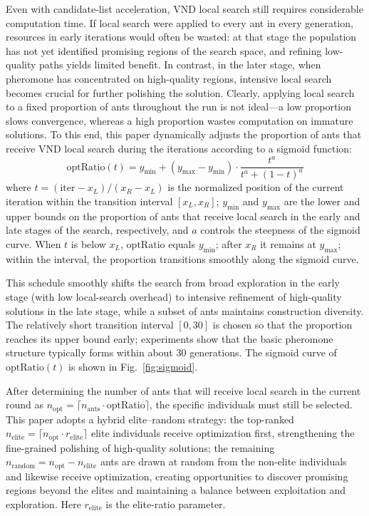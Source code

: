 Even with candidate-list acceleration, VND local search still requires considerable computation time. If local search were applied to every ant in every generation, resources in early iterations would often be wasted: at that stage the population has not yet identified promising regions of the search space, and refining low-quality paths yields limited benefit. In contrast, in the later stage, when pheromone has concentrated on high-quality regions, intensive local search becomes crucial for further polishing the solution. Clearly, applying local search to a fixed proportion of ants throughout the run is not ideal---a low proportion slows convergence, whereas a high proportion wastes computation on immature solutions. To this end, this paper dynamically adjusts the proportion of ants that receive VND local search during the iterations according to a sigmoid function:
\begin{equation}
\mathrm{optRatio}(t) = y_{\min} + (y_{\max} - y_{\min}) \cdot \frac{t^{a}}{t^{a} + (1 - t)^{a}}
\label{eq:sigmoid}
\end{equation}
where $t = (\mathrm{iter} - x_L) / (x_R - x_L)$ is the normalized position of the current iteration within the transition interval $[x_L, x_R]$; $y_{\min}$ and $y_{\max}$ are the lower and upper bounds on the proportion of ants that receive local search in the early and late stages of the search, respectively, and $a$ controls the steepness of the sigmoid curve. When $t$ is below $x_L$, $\mathrm{optRatio}$ equals $y_{\min}$; after $x_R$ it remains at $y_{\max}$; within the interval, the proportion transitions smoothly along the sigmoid curve.

This schedule smoothly shifts the search from broad exploration in the early stage (with low local-search overhead) to intensive refinement of high-quality solutions in the late stage, while a subset of ants maintains construction diversity. The relatively short transition interval $[0, 30]$ is chosen so that the proportion reaches its upper bound early; experiments show that the basic pheromone structure typically forms within about 30 generations. The sigmoid curve of $\mathrm{optRatio}(t)$ is shown in Fig.~\textcolor{blue}{\ref{fig:sigmoid}}.

After determining the number of ants that will receive local search in the current round as $n_{\mathrm{opt}} = \lceil n_{\mathrm{ants}} \cdot \mathrm{optRatio} \rceil$, the specific individuals must still be selected. This paper adopts a hybrid elite--random strategy: the top-ranked $n_{\mathrm{elite}} = \lceil n_{\mathrm{opt}} \cdot r_{\mathrm{elite}} \rceil$ elite individuals receive optimization first, strengthening the fine-grained polishing of high-quality solutions; the remaining $n_{\mathrm{random}} = n_{\mathrm{opt}} - n_{\mathrm{elite}}$ ants are drawn at random from the non-elite individuals and likewise receive optimization, creating opportunities to discover promising regions beyond the elites and maintaining a balance between exploitation and exploration. Here $r_{\mathrm{elite}}$ is the elite-ratio parameter.

